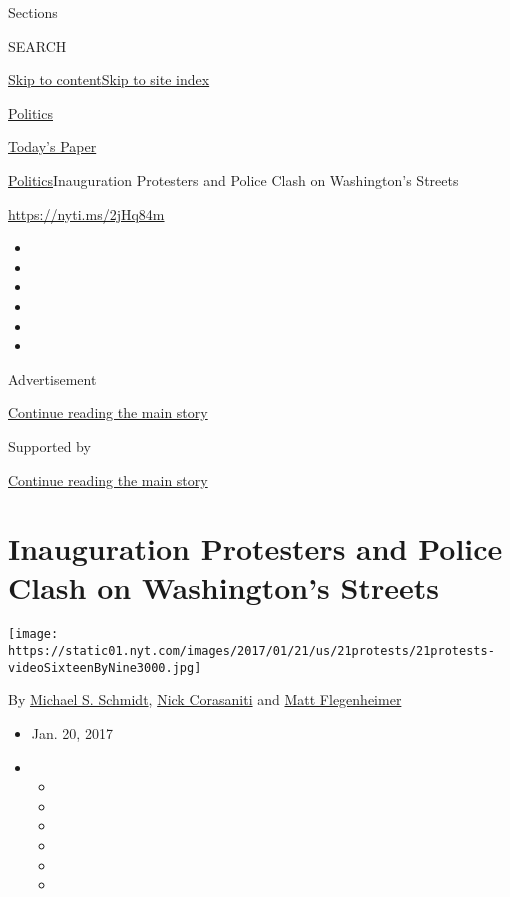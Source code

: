 Sections

SEARCH

\protect\hyperlink{site-content}{Skip to
content}\protect\hyperlink{site-index}{Skip to site index}

\href{https://www.nytimes.com/section/politics}{Politics}

\href{https://myaccount.nytimes.com/auth/login?response_type=cookie\&client_id=vi}{}

\href{https://www.nytimes.com/section/todayspaper}{Today's Paper}

\href{/section/politics}{Politics}\textbar{}Inauguration Protesters and
Police Clash on Washington's Streets

\url{https://nyti.ms/2jHq84m}

\begin{itemize}
\item
\item
\item
\item
\item
\item
\end{itemize}

Advertisement

\protect\hyperlink{after-top}{Continue reading the main story}

Supported by

\protect\hyperlink{after-sponsor}{Continue reading the main story}

\hypertarget{inauguration-protesters-and-police-clash-on-washingtons-streets}{%
\section{Inauguration Protesters and Police Clash on Washington's
Streets}\label{inauguration-protesters-and-police-clash-on-washingtons-streets}}

\texttt{[image: https://static01.nyt.com/images/2017/01/21/us/21protests/21protests-videoSixteenByNine3000.jpg]}

By \href{http://www.nytimes.com/by/michael-s-schmidt}{Michael S.
Schmidt}, \href{http://www.nytimes.com/by/nick-corasaniti}{Nick
Corasaniti} and \href{http://www.nytimes.com/by/matt-flegenheimer}{Matt
Flegenheimer}

\begin{itemize}
\item
  Jan. 20, 2017
\item
  \begin{itemize}
  \item
  \item
  \item
  \item
  \item
  \item
  \end{itemize}
\end{itemize}


